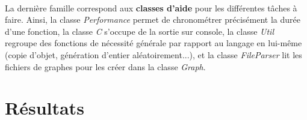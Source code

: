 \documentclass[12pt]{article}
\begin{document}
\paragraph{}La dernière famille correspond aux \textbf{classes d'aide} pour les différentes tâches à faire. Ainsi, la classe \textit{Performance} permet de chronométrer précisément la durée d'une fonction, la classe \textit{C} s'occupe de la sortie sur console, la classe \textit{Util} regroupe des fonctions de nécessité générale par rapport au langage en lui-même (copie d'objet, génération d'entier aléatoirement...), et la classe \textit{FileParser} lit les fichiers de graphes pour les créer dans la classe \textit{Graph}.

\section{Résultats}
\end{document}
